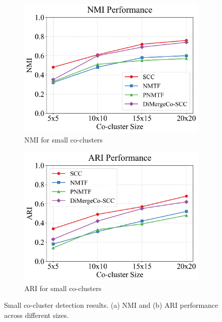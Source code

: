 \documentclass[journal]{IEEEtran}
\begin{document}
\begin{figure}[t]
    \centering
    \begin{subfigure}[b]{0.48\textwidth}
        \centering
        \includegraphics[width=\linewidth]{images/nmi_small.png}
        \caption{NMI for small co-clusters}
        \label{fig:nmi_small}
    \end{subfigure}
    \hfill
    \begin{subfigure}[b]{0.48\textwidth}
        \centering
        \includegraphics[width=\linewidth]{images/ari_small.png}
        \caption{ARI for small co-clusters}
        \label{fig:ari_small}
    \end{subfigure}
    \caption{Small co-cluster detection results. (a) NMI and (b) ARI performance across different sizes.}
    \label{fig:small-co-cluster-detection}
\end{figure}
\end{document}
